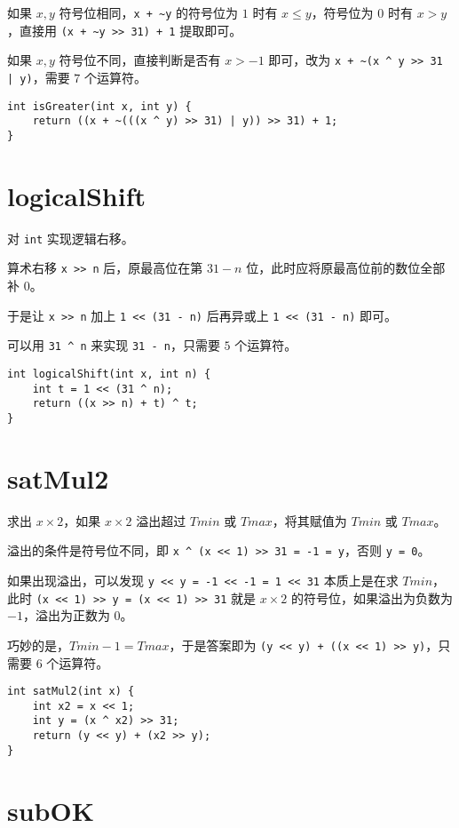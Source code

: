 \documentclass{noithesis}
\begin{document}
	如果 $x,y$ 符号位相同，\verb|x + ~y| 的符号位为 $1$ 时有 $x\leq y$，符号位为 $0$ 时有 $x>y$，直接用 \verb|(x + ~y >> 31) + 1| 提取即可。
	
	如果 $x,y$ 符号位不同，直接判断是否有 $x> -1$ 即可，改为 \verb!x + ~(x ^ y >> 31 | y)!，需要 $7$ 个运算符。
\begin{lstlisting}
int isGreater(int x, int y) {
	return ((x + ~(((x ^ y) >> 31) | y)) >> 31) + 1;
}
\end{lstlisting}
	
	\section{logicalShift}
	
	对 \verb|int| 实现逻辑右移。
	
	算术右移 \verb|x >> n| 后，原最高位在第 $31-n$ 位，此时应将原最高位前的数位全部补 $0$。
	
	于是让 \verb|x >> n| 加上 \verb|1 << (31 - n)| 后再异或上 \verb|1 << (31 - n)| 即可。
	
	可以用 \verb|31 ^ n| 来实现 \verb|31 - n|，只需要 $5$ 个运算符。
\begin{lstlisting}
int logicalShift(int x, int n) {
	int t = 1 << (31 ^ n);
	return ((x >> n) + t) ^ t;
}
\end{lstlisting}
	
	\section{satMul2}
	
	求出 $x\times 2$，如果 $x\times 2$ 溢出超过 $Tmin$ 或 $Tmax$，将其赋值为 $Tmin$ 或 $Tmax$。
	
	溢出的条件是符号位不同，即 \verb|x ^ (x << 1) >> 31 = -1 = y|，否则 \verb|y = 0|。
	
	如果出现溢出，可以发现 \verb|y << y = -1 << -1 = 1 << 31| 本质上是在求 $Tmin$，此时 \verb|(x << 1) >> y = (x << 1) >> 31| 就是 $x\times 2$ 的符号位，如果溢出为负数为 $-1$，溢出为正数为 $0$。
	
	巧妙的是，$Tmin - 1 = Tmax$，于是答案即为 \verb|(y << y) + ((x << 1) >> y)|，只需要 $6$ 个运算符。
\begin{lstlisting}
int satMul2(int x) {
	int x2 = x << 1;
	int y = (x ^ x2) >> 31;
	return (y << y) + (x2 >> y);
}
\end{lstlisting}	
	
	\section{subOK}
	
\end{document}
